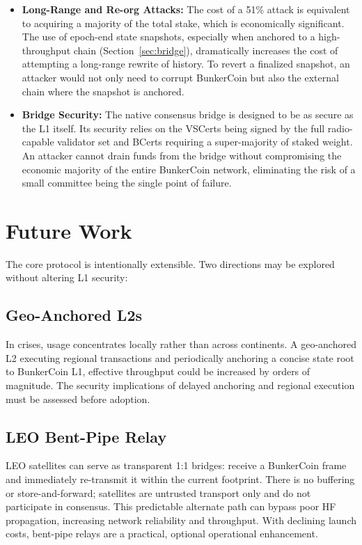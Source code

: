 \documentclass{article}
\begin{document}
\begin{itemize}
    \item \textbf{Long-Range and Re-org Attacks:} The cost of a 51\% attack is equivalent to acquiring a majority of the total stake, which is economically significant. The use of epoch-end state snapshots, especially when anchored to a high-throughput chain (Section~\ref{sec:bridge}), dramatically increases the cost of attempting a long-range rewrite of history. To revert a finalized snapshot, an attacker would not only need to corrupt BunkerCoin but also the external chain where the snapshot is anchored.

    \item \textbf{Bridge Security:} The native consensus bridge is designed to be as secure as the L1 itself. Its security relies on the VSCerts being signed by the full radio-capable validator set and BCerts requiring a super-majority of staked weight. An attacker cannot drain funds from the bridge without compromising the economic majority of the entire BunkerCoin network, eliminating the risk of a small committee being the single point of failure.
\end{itemize}

\section{Future Work}
\label{sec:future}

The core protocol is intentionally extensible. Two directions may be explored without altering L1 security:

\subsection{Geo-Anchored L2s}

In crises, usage concentrates locally rather than across continents. A geo-anchored L2 executing regional transactions and periodically anchoring a concise state root to BunkerCoin L1, effective throughput could be increased by orders of magnitude. The security implications of delayed anchoring and regional execution must be assessed before adoption.

\subsection{LEO Bent-Pipe Relay}

LEO satellites can serve as transparent 1:1 bridges: receive a BunkerCoin frame and immediately re-transmit it within the current footprint. There is no buffering or store-and-forward; satellites are untrusted transport only and do not participate in consensus. This predictable alternate path can bypass poor HF propagation, increasing network reliability and throughput. With declining launch costs, bent-pipe relays are a practical, optional operational enhancement.
\end{document}
